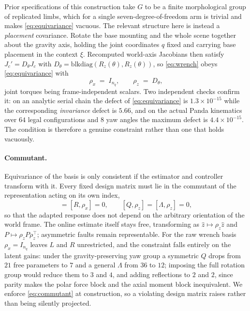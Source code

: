 Prior specifications of this construction take $G$ to be a finite morphological
group of replicated limbs, which for a single seven-degree-of-freedom arm is
trivial and makes \eqref{eq:equivariance} vacuous. The relevant structure here is
instead a \emph{placement} covariance. Rotate the base mounting and the whole
scene together about the gravity axis, holding the joint coordinates $q$ fixed and
carrying base placement in the context $\xi$. Recomputed world-axis Jacobians then
satisfy $J_c' = D_\theta J_c$ with
$D_\theta=\mathrm{blkdiag}(R_z(\theta),R_z(\theta))$, so \eqref{eq:wrench} obeys
\eqref{eq:equivariance} with
\begin{equation}
\rho_x \;=\; I_{n_q},\qquad \rho_z \;=\; D_\theta ,
\label{eq:yawrep}
\end{equation}
joint torques being frame-independent scalars. Two independent checks confirm it:
on an analytic serial chain the defect of \eqref{eq:equivariance} is
$1.3\times10^{-15}$ while the corresponding \emph{invariance} defect is $5.66$, and
on the actual Panda kinematics over $64$ legal configurations and $8$ yaw angles
the maximum defect is $4.4\times10^{-15}$. The condition is therefore a genuine
constraint rather than one that holds vacuously.

\paragraph{Commutant.} Equivariance of the basis is only consistent if the
estimator and controller transform with it. Every fixed design matrix must lie in
the commutant of the representation acting on its own index,
\begin{equation}
[L,\rho_x]=[R,\rho_x]=0,\qquad [Q,\rho_z]=[\Lambda,\rho_z]=0 ,
\label{eq:commutant}
\end{equation}
so that the adapted response does not depend on the arbitrary orientation of the
world frame. The online estimate itself stays free, transforming as
$\hat z\mapsto\rho_z\hat z$ and $P\mapsto\rho_zP\rho_z^\top$; asymmetric faults
remain representable. For the raw wrench basis $\rho_x=I_{n_q}$ leaves $L$ and $R$
unrestricted, and the constraint falls entirely on the latent gains: under the
gravity-preserving yaw group a symmetric $Q$ drops from $21$ free parameters to
$7$ and a general $\Lambda$ from $36$ to $12$; imposing the full rotation group
would reduce them to $3$ and $4$, and adding reflections to $2$ and $2$, since
parity makes the polar force block and the axial moment block inequivalent. We
enforce \eqref{eq:commutant} at construction, so a violating design matrix raises
rather than being silently projected.

